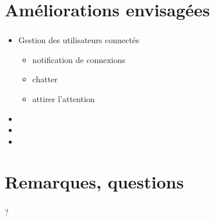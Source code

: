 \documentclass[11pt]{beamer}
\begin{document}
\section{Améliorations envisagées}
\begin{frame}
	\frametitle{\currentname}
  \begin{itemize}
    \item Gestion des utilisateurs connectés
      \begin{itemize}
        \item notification de connexions
        \item chatter
        \item attirer l'attention
      \end{itemize}
    \item 
    \item 
    \item 
  \end{itemize}
\end{frame}

\section{Remarques, questions}
\begin{frame}
  \frametitle{\currentname}
  \begin{center}
  ?
  \end{center}
\end{frame}
\end{document}
